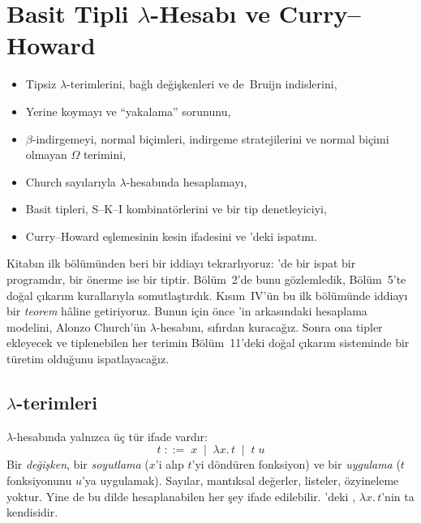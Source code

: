 \chapter{Basit Tipli $λ$-Hesabı ve Curry--Howard}\label{bol:lambda}

\begin{bolumhedefleri}
\begin{itemize}
  \item Tipsiz $\lambda$-terimlerini, bağlı değişkenleri ve de~Bruijn
        indislerini,
  \item Yerine koymayı ve ``yakalama'' sorununu,
  \item $\beta$-indirgemeyi, normal biçimleri, indirgeme stratejilerini ve
        normal biçimi olmayan $\Omega$ terimini,
  \item Church sayılarıyla $\lambda$-hesabında hesaplamayı,
  \item Basit tipleri, S--K--I kombinatörlerini ve bir tip denetleyiciyi,
  \item Curry--Howard eşlemesinin kesin ifadesini ve \Lean{}'deki
        ispatını.
\end{itemize}
\end{bolumhedefleri}

Kitabın ilk bölümünden beri bir iddiayı tekrarlıyoruz: \Lean{}'de bir
ispat bir programdır, bir önerme ise bir tiptir. Bölüm~2'de bunu
gözlemledik, Bölüm~5'te doğal çıkarım kurallarıyla somutlaştırdık.
Kısım~IV'ün bu ilk bölümünde iddiayı bir \emph{teorem} hâline
getiriyoruz. Bunun için önce \Lean{}'in arkasındaki hesaplama modelini,
Alonzo Church'ün $\lambda$-hesabını, sıfırdan kuracağız. Sonra ona tipler
ekleyecek ve tiplenebilen her terimin Bölüm~11'deki doğal çıkarım
sisteminde bir türetim olduğunu ispatlayacağız.

\section{$λ$-terimleri}\label{sec:lambda-terimler}

$\lambda$-hesabında yalnızca üç tür ifade vardır:
\[
  t \;::=\; x \;\mid\; \lambda x.\, t \;\mid\; t\; u
\]
Bir \emph{değişken}, bir \emph{soyutlama} ($x$'i alıp $t$'yi döndüren
fonksiyon) ve bir \emph{uygulama} ($t$ fonksiyonunu $u$'ya uygulamak).
Sayılar, mantıksal değerler, listeler, özyineleme yoktur. Yine de bu
dilde hesaplanabilen her şey ifade edilebilir. \Lean{}'deki 
, $\lambda x.\, t$'nin ta kendisidir.


